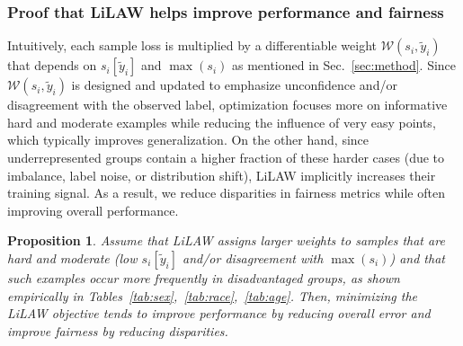 \documentclass{article}
\theoremstyle{plain}
\newtheorem{proposition}[theorem]{Proposition}
\theoremstyle{definition}
\theoremstyle{remark}
\begin{document}
\subsubsection{Proof that LiLAW helps improve performance and fairness}

Intuitively, each sample loss is multiplied by a differentiable weight
$\mathcal{W}(s_i,\tilde y_i)$ that depends on $s_i[\tilde y_i]$ and $\max(s_i)$ as mentioned in Sec.~\ref{sec:method}. Since $\mathcal{W}(s_i,\tilde y_i)$ is designed and updated to emphasize unconfidence and/or disagreement with the observed label, optimization focuses more on informative hard and moderate examples while reducing the influence of very easy points, which typically improves generalization. On the other hand, since underrepresented groups contain a higher fraction of these harder cases (due to imbalance, label noise, or distribution shift), LiLAW implicitly increases their training signal. As a result, we reduce disparities in fairness metrics while often improving overall performance.

\begin{proposition}
Assume that LiLAW assigns larger weights to samples that are hard and moderate (low $s_i[\tilde y_i]$ and/or disagreement with $\max(s_i)$) and that such examples occur more frequently in disadvantaged groups, as shown empirically in Tables~\ref{tab:sex},~\ref{tab:race},~\ref{tab:age}. Then, minimizing the LiLAW objective tends to improve performance by reducing overall error and improve fairness by reducing disparities.
\label{prop}
\end{proposition}
\end{document}
